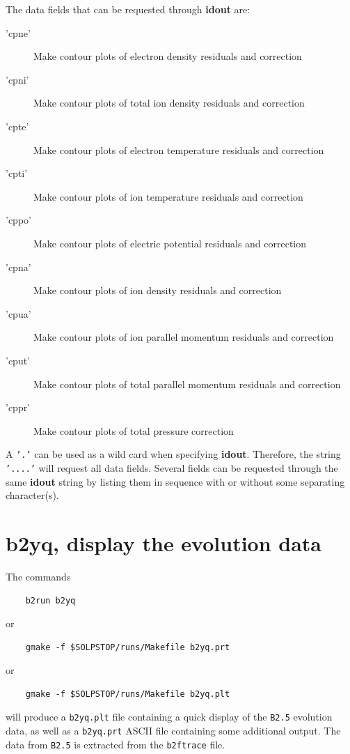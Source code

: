 \documentclass[a4paper,10pt]{report}
\begin{document}
The data fields that can be requested through {\bf idout} are:
\begin{description}
  \item['cpne'] Make contour plots of electron density residuals and correction
  \item['cpni'] Make contour plots of total ion density residuals and correction
  \item['cpte'] Make contour plots of electron temperature residuals and correction
  \item['cpti'] Make contour plots of ion temperature residuals and correction
  \item['cppo'] Make contour plots of electric potential residuals and correction
  \item['cpna'] Make contour plots of ion density residuals and correction
  \item['cpua'] Make contour plots of ion parallel momentum residuals and correction
  \item['cput'] Make contour plots of total parallel momentum residuals and correction
  \item['cppr'] Make contour plots of total pressure correction
\end{description}
A {\tt '.'} can be used as a wild card when specifying {\bf idout}.
Therefore, the string {\tt '....'} will request all data fields.
Several fields can be requested through the same {\bf idout} string by listing them
in sequence with or without some separating character(s).

\newpage
\section{b2yq, display the evolution data}
\label{sec:b2yq}

The commands
\begin{verbatim}
    b2run b2yq
\end{verbatim}
or
\begin{verbatim}
    gmake -f $SOLPSTOP/runs/Makefile b2yq.prt
\end{verbatim}
or
\begin{verbatim}
    gmake -f $SOLPSTOP/runs/Makefile b2yq.plt
\end{verbatim}
will produce a {\tt b2yq.plt} file containing a quick display of the
{\tt B2.5} evolution data, as well as a {\tt b2yq.prt} ASCII file containing
some additional output.
The data from {\tt B2.5} is extracted from the {\tt b2ftrace} file.
\end{document}
